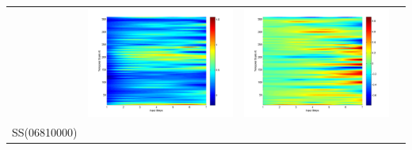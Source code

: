 \documentclass[11pt]{article}
\begin{document}
\begin{table}[H]
{\begin{tabular}{cccc}
&\begin{minipage}{.3\textwidth}\includegraphics[width=\linewidth]{resultgraph/11532500diff_ep.png}\end{minipage}
&\begin{minipage}{.3\textwidth}\includegraphics[width=\linewidth]{resultgraph/11532500diff_q.png}\end{minipage}
\\
SS(06810000)

\end{tabular}}
\end{table}
\end{document}
